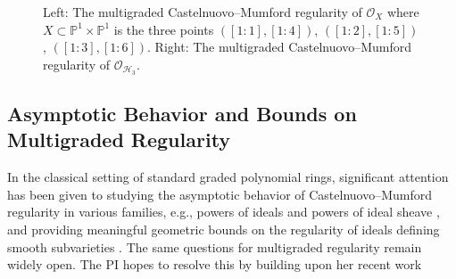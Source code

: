 \documentclass[11pt,reqno]{amsart}
\theoremstyle{remark}
\newcommand{\PP}{\mathbb{P}}
\newcommand{\cH}{\mathcal{H}}
\newcommand{\cO}{\mathcal{O}}
\begin{document}
\begin{center}
\begin{figure}\label{fig:example-of-reg}
\newcommand{\makegrid}{
  \path[use as bounding box] (-3.45,-3.25) rectangle (5.45,5.25);
  \foreach \x in {-1,...,5}
  \foreach \y in {-1,...,5}
    { \fill[Gray,fill=gray] (\x,\y) circle (1.5pt); }
  \draw[-,  semithick] (-1,0)--(5,0);
  \draw[-,  semithick] (0,-1)--(0,5);
}
 \quad \quad
{} 
\caption{Left: The multigraded Castelnuovo--Mumford regularity of $\cO_{X}$ where $X\subset \PP^{1}\times \PP^{1}$ is the three points $([1:1],[1:4])$, $([1:2],[1:5])$, $([1:3],[1:6])$. Right: The multigraded Castelnuovo--Mumford regularity of $\cO_{\cH_{3}}$.}
\end{figure}
\end{center}






 \subsection{Asymptotic Behavior and Bounds on Multigraded Regularity}

In the classical setting of standard graded polynomial rings, significant attention has been given to studying the asymptotic behavior of Castelnuovo–Mumford regularity in various families, e.g., powers of ideals \cite{chandler97,Kodiyalam00,CHT99,BCHT13} and powers of ideal sheave \cite{cutkoskySrinivas93,cutkosky00,CEL01}, and providing meaningful geometric bounds on the regularity of ideals defining smooth subvarieties \cite{GLP83, eisenbudGoto84, BEL91, MP18}. The same questions for multigraded regularity remain widely open. The PI hopes to resolve this by building upon her recent work \cite{bruceHellerSayrafi22}
 
\end{document}
